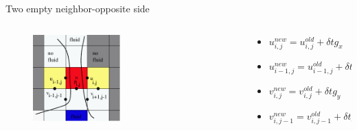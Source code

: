 \documentclass{beamer}
\begin{document}
	\begin{frame}{Two empty neighbor-opposite side}
	  \begin{columns}
	 	\begin{column}[c]{0.4\textwidth}
	 	\begin{figure}
			\includegraphics[width=0.49\textwidth]{pic/two2.pdf}
		 \end{figure}
		\end{column}
		\begin{column}[c]{0.6\textwidth}
				\begin{itemize}
					\item $ u_{i,j}^{new}= u_{i,j}^{old} +\delta t g_x $
					\item $ u_{i-1,j}^{new}= u_{i-1,j}^{old} +\delta t g_x $
					\item $ v_{i,j}^{new}= v_{i,j}^{old} +\delta t g_y $
					\item $ v_{i,j-1}^{new}= v_{i,j-1}^{old} +\delta t g_y $
				\end{itemize}
			\end{column}
		\end{columns}
	\end{frame}	
	
\end{document}
